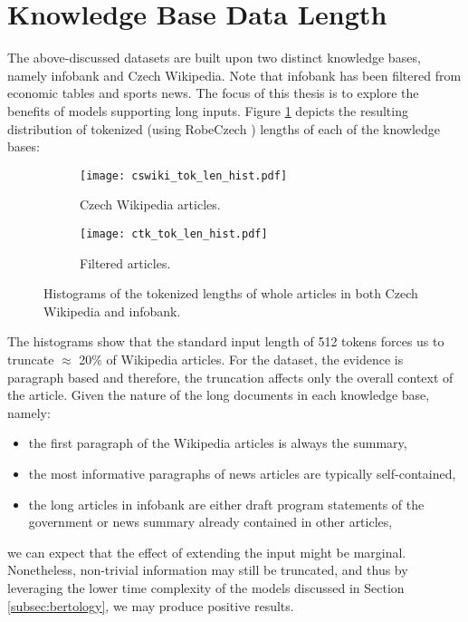 \section{Knowledge Base Data Length}
\label{sec:data_length}

The above-discussed datasets are built upon two distinct knowledge bases, namely \CTK{} infobank and Czech Wikipedia.
Note that \CTK{} infobank has been filtered from economic tables and sports news.
The focus of this thesis is to explore the benefits of models supporting long inputs. 
Figure \ref{fig:len_hist} depicts the resulting distribution of tokenized (using RobeCzech \citep{robeczech}) lengths of each of the knowledge bases:
\begin{figure}[!htb]
  \centering
  \begin{subfigure}[t]{.49\textwidth}
    \texttt{[image: cswiki\_tok\_len\_hist.pdf]}
    \caption{Czech Wikipedia articles.}
  \end{subfigure}
  \hfill
  \begin{subfigure}[t]{.49\textwidth}
    \texttt{[image: ctk\_tok\_len\_hist.pdf]}
    \caption{Filtered \CTK{} articles.}
  \end{subfigure}
  \caption[Histograms of Tokenized Datasets Lengths]{Histograms of the tokenized lengths of whole articles in both Czech Wikipedia and \CTK{} infobank.}
  \label{fig:len_hist}
\end{figure}

The histograms show that the standard input length of 512 tokens forces us to truncate $\approx$ 20\% of Wikipedia articles. For the \CTK{} dataset, the evidence is paragraph based and therefore, the truncation affects only the overall context of the article.
Given the nature of the long documents in each knowledge base, namely:
\begin{itemize}
  \item the first paragraph of the Wikipedia articles is always the summary,
  \item the most informative paragraphs of \CTK{} news articles are typically self-contained,
  \item the long articles in \CTK{} infobank are either draft program statements of the government or news summary already contained in other articles,
\end{itemize}
we can expect that the effect of extending the input might be marginal.
Nonetheless, non-trivial information may still be truncated, and thus by leveraging the lower time complexity of the models discussed in Section \ref{subsec:bertology}, we may produce positive results.

